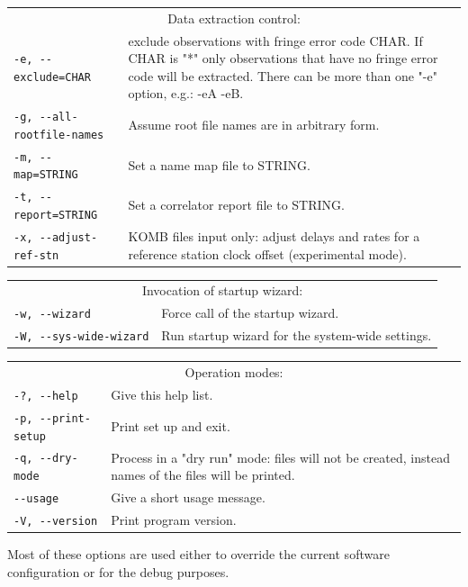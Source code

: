 \documentclass [10pt,letterpaper]{report}
\begin{document}
\begin{tabular}{p{\leftSp}p{\riteSp}}
\multicolumn{2}{c}{Data extraction control:}\\
{\tt -e, -{}-exclude=CHAR}      & exclude observations with fringe error code CHAR. If CHAR is "*" only observations
    that have no fringe error code will be extracted. There can be more than one "-e" option, e.g.: -eA -eB.\\
{\tt -g, -{}-all-rootfile-names}& Assume root file names are in arbitrary form.\\
{\tt -m, -{}-map=STRING}        & Set a name map file to STRING.\\
{\tt -t, -{}-report=STRING}     & Set a correlator report file to STRING.\\
{\tt -x, -{}-adjust-ref-stn}    & KOMB files input only: adjust delays and rates for a reference station clock offset (experimental mode).\\
\end{tabular}
\vspace{5mm}

\begin{tabular}{p{\leftSp}p{\riteSp}}
\multicolumn{2}{c}{Invocation of startup wizard:}\\
{\tt -w, -{}-wizard}            & Force call of the startup wizard.\\
{\tt -W, -{}-sys-wide-wizard}   & Run startup wizard for the system-wide settings.\\
\end{tabular}
\vspace{5mm}

\begin{tabular}{p{\leftSp}p{\riteSp}}
\multicolumn{2}{c}{Operation modes:}\\
{\tt -?, -{}-help}              & Give this help list.\\
{\tt -p, -{}-print-setup}       & Print set up and exit.\\
{\tt -q, -{}-dry-mode}          & Process in a "dry run" mode: files will not be created, instead names of the files will be printed.\\
{\tt     -{}-usage}             & Give a short usage message.\\
{\tt -V, -{}-version}           & Print program version.\\
\end{tabular}
\vspace{5mm}


\noindent
Most of these options are used either to override the current software
configuration or for the debug purposes.
\end{document}
